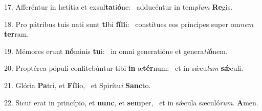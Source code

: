 17. Afferéntur in lætítia et exsul\textbf{ta}ti\textbf{ó}ne: \ast\  adducéntur in tem\textit{plum} \textbf{Re}gis.\

18. Pro pátribus tuis nati sunt \textbf{ti}bi \textbf{fí}\textbf{li}i: \ast\  constítues eos príncipes super om\textit{nem} \textbf{ter}ram.\

19. Mémores erunt \textbf{nó}minis \textbf{tu}i: \ast\  in omni generatióne et genera\textit{ti}\textbf{ó}nem.\

20. Proptérea pópuli confitebúntur tibi \textbf{in} æ\textbf{tér}num: \ast\  et in sǽcu\textit{lum} \textbf{sǽ}culi.\

21. Glória \textbf{Pa}tri, et \textbf{Fí}\textbf{li}o, \ast\  et Spirítu\textit{i} \textbf{Sanc}to.\

22. Sicut erat in princípio, et \textbf{nunc}, et \textbf{sem}per, \ast\  et in sǽcula sæculó\textit{rum}. \textbf{A}men.\

